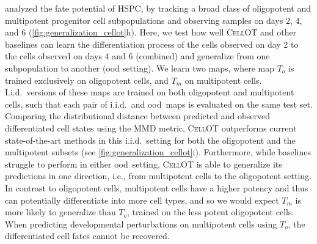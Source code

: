 
\citet{weinreb2020lineage} analyzed the fate potential of \acrfull{HSPC}, by tracking a broad class of oligopotent %
and multipotent %
 progenitor cell subpopulations and observing samples on days 2, 4, and 6 (\cref{fig:generalization_cellot}h).
Here, we test how well \textsc{CellOT} and other baselines can learn the differentiation process of the cells observed on day 2 to the cells observed on days 4 and 6 (combined) and generalize from one subpopulation to another (\acrshort{ood} setting).
We learn two maps, where map $T_o$ is trained exclusively on oligopotent cells, and $T_m$ on multipotent cells.
I.i.d.~versions of these maps are trained on both oligopotent and multipotent cells, such that each pair of i.i.d.~and \acrshort{ood}~maps is evaluated on the same test set.
Comparing the distributional distance between predicted and observed differentiated cell states using the \acrshort{MMD} metric, \textsc{CellOT} outperforms current state-of-the-art methods in this i.i.d.~setting for both the oligopotent and the multipotent subsets (see \cref{fig:generalization_cellot}i).
Furthermore, while baselines struggle to perform in either \acrshort{ood}~setting, \textsc{CellOT} is able to generalize its predictions in one direction, i.e., from multipotent cells to the oligopotent setting.
In contrast to oligopotent cells, multipotent cells have a higher potency and thus can potentially differentiate into more cell types, and so we would expect $T_m$ is more likely to generalize than $T_o$, trained on the less potent oligopotent cells.
When predicting developmental perturbations on multipotent cells using $T_o$, the differentiated cell fates cannot be recovered.

